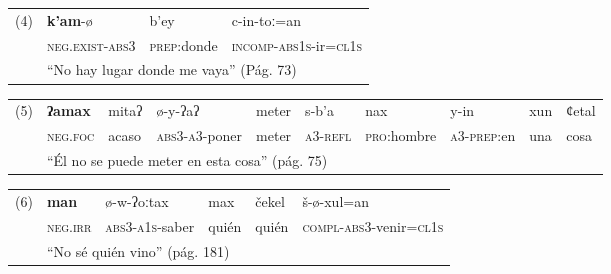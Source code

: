 {      %
      \begin{tabular}{rlll}
            \multicolumn{1}{l}{(4)} & \textbf{k'am}-ø                                            & b'ey                & c-in-toː=an                            \\
                                    & \textsc{neg.exist-abs3}                                    & \textsc{prep}:donde & \textsc{incomp-abs1s}-ir=\textsc{cl1s} \\
                                    & \multicolumn{3}{l}{“No hay lugar donde me vaya” (Pág. 73)}                                                                \\
      \end{tabular} \vspace{0.25cm}

      \begin{tabular}{rlllllllll}
            \multicolumn{1}{l}{(5)} & \textbf{ʔamax}                                                    & mitaʔ & ø-y-ʔaʔ                & meter & s-b'a            & nax                 & y-in                & xun & ȼetal \\
                                    & \textsc{neg.foc}                                                  & acaso & \textsc{abs3-a3}-poner & meter & \textsc{a3-refl} & \textsc{pro}:hombre & \textsc{a3-prep}:en & una & cosa  \\
                                    & \multicolumn{9}{l}{“Él no se puede meter en esta cosa” (pág. 75)}                                                                                                                       \\
      \end{tabular} \vspace{0.25cm}

      \begin{tabular}{rlllll}
            \multicolumn{1}{l}{(6)} & \textbf{man}                                      & ø-w-ʔoːtax              & max   & čekel & š-ø-xul=an                              \\
                                    & \textsc{neg.irr}                                  & \textsc{abs3-a1s}-saber & quién & quién & \textsc{compl-abs3}-venir=\textsc{cl1s} \\
                                    & \multicolumn{5}{l}{“No sé quién vino” (pág. 181)}                                                                                     \\
      \end{tabular} \vspace{0.25cm}

}
